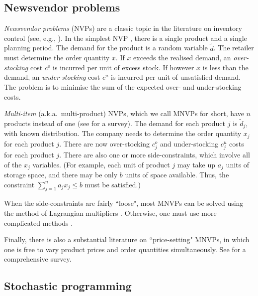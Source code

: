 \documentclass[a4paper,11pt]{article}
\begin{document}
\subsection{Newsvendor problems} \label{sub:lit1}

\emph{Newsvendor problems} (NVPs) are a classic topic in the literature on inventory control (see, e.g., \cite{Ch12,Po02,Zi00}). In the simplest NVP \cite{HW63}, there is a single product and a single planning period. The demand for the product is a random variable $\tilde d$. The retailer must determine the order quantity $x$. If $x$ exceeds the realised demand, an \emph{over-stocking} cost $c^o$ is incurred per unit of excess stock. If however $x$ is less than the demand, an \emph{under-stocking} cost $c^u$ is incurred per unit of unsatisfied demand. The problem is to minimise the sum of the expected over- and under-stocking costs.

\emph{Multi-item} (a.k.a.\ multi-product) NVPs, which we call MNVPs for short, have $n$ products instead of one (see \cite{Tu12} for a survey). The demand for each product $j$ is $\tilde d_j$, with known distribution. The company needs to determine the order quantity $x_j$ for each product $j$. There are now over-stocking $c^o_j$ and under-stocking $c^u_j$ costs for each product $j$. There are also one or more side-constraints, which involve all of the $x_j$ variables. (For example, each unit of product $j$ may take up $a_j$ units of storage space, and there may be only $b$ units of space available. Thus, the constraint $\sum_{j=1}^n a_j x_j \le b$ must be satisfied.)

When the side-constraints are fairly ``loose", most MNVPs can be solved using the method of Lagrangian multipliers \cite{BR93,HW63}. Otherwise, one must use more complicated methods \cite{AM05,LL95,ZXH09}. 

Finally, there is also a substantial literature on ``price-setting" MNVPs, in which one is free to vary product prices and order quantities simultaneously. See \cite{De20} for a comprehensive survey.

\subsection{Stochastic programming} \label{sub:lit2}
\end{document}
